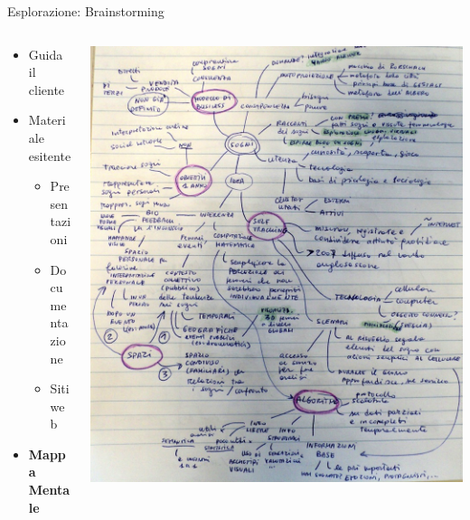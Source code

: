 \documentclass[compress, red, 14pt]{beamer}
\begin{document}
	\begin{frame}{Esplorazione: Brainstorming}		
		\begin{columns}[T]
		    \begin{column}{.5\textwidth}
				\begin{itemize}
					\item Guida il cliente
					\item Materiale esitente
					\begin{itemize}
						\item Presentazioni
						\item Documentazione
						\item Siti web
					\end{itemize}
				\end{itemize}	

				\begin{itemize}
					\item \textbf{Mappa Mentale}
				\end{itemize}
		    \end{column}
		    \begin{column}{.5\textwidth}
				\hspace*{-0.4cm}
			    \includegraphics[scale=0.18]{images/mindmap.png}
		    \end{column}
		 \end{columns}
	\end{frame}
\end{document}
